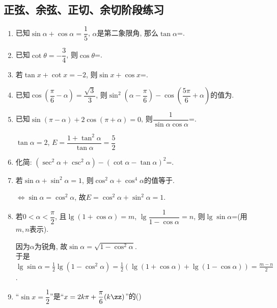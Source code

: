 \subsection{正弦、余弦、正切、余切阶段练习}

\begin{enumerate}
\item 已知$\sin\alpha+\cos\alpha=\dfrac{1}{5}$, $\alpha$是第二象限角, 那么$\tan\alpha$=. 

\item 已知$\cot\theta=-\dfrac{3}{4}$, 则$\cos\theta$=. 

\item 若$\tan{x}+\cot{x}=-2$, 则$\sin{x}+\cos{x}$=. 

\item 已知$\cos\left(\dfrac{\pi}{6}-\alpha\right)=\dfrac{\sqrt{3}}{3}$, 
则$\sin^2\left(\alpha-\dfrac{\pi}{6}\right)-\cos\left(\dfrac{5\pi}{6}+\alpha\right)$的值为. 

\item 已知$\sin(\pi-\alpha)+2\cos(\pi+\alpha)=0$, 则$\dfrac{1}{\sin\alpha\cos\alpha}$=. 
\begin{jieda}
$\tan\alpha=2$, $E=\dfrac{1+\tan^2\alpha}{\tan\alpha}=\dfrac{5}{2}$
\end{jieda}

\item 化简: $(\sec^2\alpha+\csc^2\alpha)-(\cot\alpha-\tan\alpha)^2$=. 

\item 若$\sin\alpha+\sin^2\alpha=1$, 则$\cos^{2}\alpha+\cos^{4}\alpha$的值等于. 
\begin{jieda}
$\iff\sin\alpha=\cos^2\alpha$, 故$E=\cos^2\alpha+\sin^2\alpha=1$. 
\end{jieda}

\item 若$0<\alpha<\dfrac{\pi}{2}$, 且$\lg(1+\cos\alpha)=m$, $\lg\dfrac{1}{1-\cos\alpha}=n$, 则$\lg\sin\alpha$=(用$m,n$表示). 
\begin{jieda}
因为$\alpha$为锐角, 故$\sin\alpha=\sqrt{1-\cos^2\alpha}$. \\
于是$\lg\sin\alpha=\frac{1}{2}\lg(1-\cos^2\alpha)=\frac{1}{2}(\lg(1+\cos\alpha)+\lg(1-\cos\alpha))=\frac{m-n}{2}$. 
\end{jieda}

\item ``$\sin{x}=\dfrac{1}{2}$''是``$x=2k\pi+\dfrac{\pi}{6}(k\zz)$''的\dotfill()


\end{enumerate}
